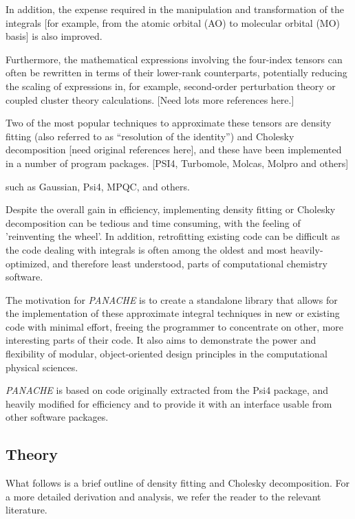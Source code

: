 \documentclass[12pt,letterpaper]{article}
\newcommand{\panache}{\textit{PANACHE}\xspace}
\begin{document}
In addition, the expense required in the manipulation and transformation of
the integrals [for example, from the atomic orbital (AO) to molecular orbital
(MO) basis] is also improved.

Furthermore, the mathematical expressions involving the four-index tensors can
often be rewritten in terms of their lower-rank counterparts, potentially
reducing the scaling of expressions in, for example, second-order perturbation
theory or coupled cluster theory calculations.\cite{Werner:2003a} [Need lots more
references here.]


Two of the most
popular techniques to approximate these tensors are density fitting (also referred to
as ``resolution of the identity'') and Cholesky decomposition [need original
references here], and these have been implemented in a number of program packages.
[PSI4, Turbomole, Molcas, Molpro and others]




such as Gaussian\cite{Gaussian09}, Psi4\cite{Turney:2012a}, MPQC, and
others. 


Despite the overall gain in efficiency, implementing density fitting
or Cholesky decomposition can be tedious and time consuming, with the
feeling of 'reinventing the wheel'. In addition, retrofitting existing
code can be difficult as the code dealing with integrals is often among
the oldest and most heavily-optimized, and therefore least understood,
parts of computational chemistry software.

The motivation for \panache is to create a standalone library that
allows for the implementation of these approximate integral techniques
in new or existing code with minimal effort, freeing the programmer to
concentrate on other, more interesting parts of their code. It also aims
to demonstrate the power and flexibility of modular, object-oriented
design principles in the computational physical sciences.

\panache is based on code originally extracted from the
Psi4\cite{Turney:2012a} package, and heavily modified for efficiency
and to provide it with an interface usable from other software packages.


\subsection{Theory}
\label{sec:theory}

What follows is a brief outline of density fitting and Cholesky decomposition.
For a more detailed derivation and analysis, we refer the reader to the
relevant literature.
\end{document}
